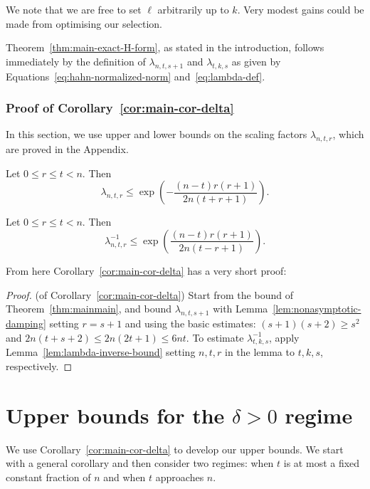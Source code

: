 \documentclass[manuscript,nonacm]{acmart}
\begin{document}
We note that we are free to set $\ell$ arbitrarily up to $k$. Very modest gains could be made from optimising our selection.

Theorem~\ref{thm:main-exact-H-form}, as stated in the introduction, follows immediately by the definition of $\lambda_{n,t,s+1}$ and $\lambda_{t,k,s}$ as given by Equations~\ref{eq:hahn-normalized-norm} and~\ref{eq:lambda-def}.


\subsubsection{Proof of Corollary~\ref{cor:main-cor-delta}}
\label{s:subsubsectionCor}
In this section, we use upper and lower bounds on the scaling factors $\lambda_{n,t,r}$, which are proved in the Appendix.
\begin{lemma}
\label{lem:nonasymptotic-damping}
Let \(0\le r\le t<n\). Then
\begin{equation}
\label{eq:single-r-damping}
    \lambda_{n,t,r}
    \le
    \exp\!\left(
        -
        \frac{(n-t)r(r+1)}
             {2n(t+r+1)}
    \right).
\end{equation}
\end{lemma}


\begin{lemma}
\label{lem:lambda-inverse-bound}
Let \(0\le r\le t< n\). Then
\[
    \lambda_{n,t,r}^{-1}
    \le
    \exp\!\left(
        \frac{(n-t)r(r+1)}
             {2n(t-r+1)}
    \right).
\]
\end{lemma}




From here Corollary~\ref{cor:main-cor-delta} has a very short proof:
\begin{proof} (of Corollary~\ref{cor:main-cor-delta})
    Start from the bound of Theorem~\ref{thm:mainmain}, and bound $\lambda_{n,t,s+1}$ with Lemma~\ref{lem:nonasymptotic-damping} setting $r=s+1$ and using the basic estimates: $(s+1)(s+2)\geq s^2$ and $2n(t+s+2)\leq 2n(2t+1)\leq 6nt$. To estimate $\lambda^{-1}_{t,k,s}$, apply Lemma~\ref{lem:lambda-inverse-bound} setting $n,t,r$ in the lemma to $t,k,s$, respectively. 
\end{proof}

\section{Upper bounds for the $\delta>0$ regime}
\label{s:applications}

We use Corollary~\ref{cor:main-cor-delta} to develop our upper bounds. We start with a general corollary and then consider two regimes: when $t$ is at most a fixed constant fraction of $n$ and when $t$ approaches $n$.
\end{document}
